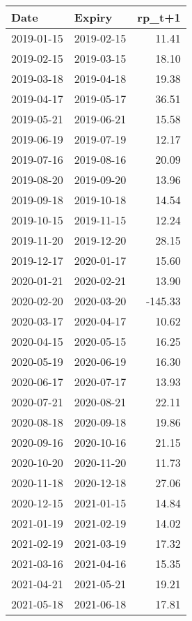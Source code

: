 \begin{tabular}{llr}
\toprule
      Date &     Expiry &  rp\_t+1 \\
\midrule
2019-01-15 & 2019-02-15 &   11.41 \\
2019-02-15 & 2019-03-15 &   18.10 \\
2019-03-18 & 2019-04-18 &   19.38 \\
2019-04-17 & 2019-05-17 &   36.51 \\
2019-05-21 & 2019-06-21 &   15.58 \\
2019-06-19 & 2019-07-19 &   12.17 \\
2019-07-16 & 2019-08-16 &   20.09 \\
2019-08-20 & 2019-09-20 &   13.96 \\
2019-09-18 & 2019-10-18 &   14.54 \\
2019-10-15 & 2019-11-15 &   12.24 \\
2019-11-20 & 2019-12-20 &   28.15 \\
2019-12-17 & 2020-01-17 &   15.60 \\
2020-01-21 & 2020-02-21 &   13.90 \\
2020-02-20 & 2020-03-20 & -145.33 \\
2020-03-17 & 2020-04-17 &   10.62 \\
2020-04-15 & 2020-05-15 &   16.25 \\
2020-05-19 & 2020-06-19 &   16.30 \\
2020-06-17 & 2020-07-17 &   13.93 \\
2020-07-21 & 2020-08-21 &   22.11 \\
2020-08-18 & 2020-09-18 &   19.86 \\
2020-09-16 & 2020-10-16 &   21.15 \\
2020-10-20 & 2020-11-20 &   11.73 \\
2020-11-18 & 2020-12-18 &   27.06 \\
2020-12-15 & 2021-01-15 &   14.84 \\
2021-01-19 & 2021-02-19 &   14.02 \\
2021-02-19 & 2021-03-19 &   17.32 \\
2021-03-16 & 2021-04-16 &   15.35 \\
2021-04-21 & 2021-05-21 &   19.21 \\
2021-05-18 & 2021-06-18 &   17.81 \\
\bottomrule
\end{tabular}
